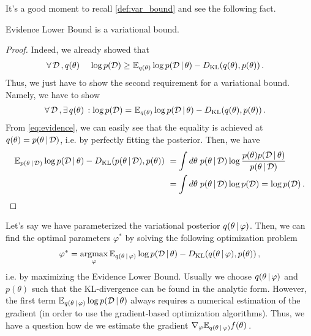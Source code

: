 It's a good moment to recall \cref{def:var_bound} and see the following fact.
\begin{theorem}
    Evidence Lower Bound is a variational bound.
\end{theorem}
\begin{proof}
    Indeed, we already showed that 
    \begin{align}
        \forall\, \mathcal{D}\,, q(\theta)\, \quad \log p(\mathcal{D}) \geq~& \mathbb{E}_{q(\theta)} \log p(\mathcal{D}\,|\, \theta) -D_{\mathrm{KL}}(q(\theta),p(\theta))\,.
    \end{align}
    Thus, we just have to show the second requirement for a variational bound.
    Namely, we have to show
    \begin{align}
        \forall\, \mathcal{D}\,, \exists\, q(\theta)\, : \log p(\mathcal{D}) =~& \mathbb{E}_{q(\theta)} \log p(\mathcal{D}\,|\, \theta) -D_{\mathrm{KL}}(q(\theta),p(\theta))\,.
    \end{align}
    From \cref{eq:evidence}, we can easily see that the equality is achieved at $q(\theta) = p(\theta\,|\, \mathcal{D})$, i.e. by perfectly fitting the posterior.
    Then, we have
    \begin{align}
        \mathbb{E}_{p(\theta\,|\,\mathcal{D})} \log p(\mathcal{D}\,|\, \theta) -D_{\mathrm{KL}}(p(\theta\,|\,\mathcal{D}),p(\theta)) ~&= \int d\theta\; p(\theta\,|\,\mathcal{D}) \log\frac{p(\theta)p(\mathcal{D}\,|\, \theta)}{p(\theta\,|\,\mathcal{D})} \\
        ~&= \int d\theta\; p(\theta\,|\,\mathcal{D}) \log p(\mathcal{D}) =  \log p(\mathcal{D})\,.
    \end{align}
\end{proof}

Let's say we have parameterized the variational posterior $q(\theta\,|\,\varphi)$. 
Then, we can find the optimal parameters $\varphi^*$ by solving the following optimization problem
\begin{align}
    \varphi^* = \operatorname*{argmax}_\varphi \mathbb{E}_{q(\theta\,|\, \varphi)} \log p(\mathcal{D}\,|\, \theta) -D_{\mathrm{KL}}(q(\theta\,|\, \varphi),p(\theta))\,,
\end{align}
i.e. by maximizing the Evidence Lower Bound.
Usually we choose $q(\theta\,|\,\varphi)$ and $p(\theta)$ such that the KL-divergence can be found in the analytic form.
However, the first term $\mathbb{E}_{q(\theta\,|\, \varphi)} \log p(\mathcal{D}\,|\, \theta)$ always requires a numerical estimation of the gradient (in order to use the gradient-based optimization algorithms).
Thus, we have a question how de we estimate the gradient $\nabla_\varphi \mathbb{E}_{q(\theta\,|\, \varphi)} f(\theta)$\,.

